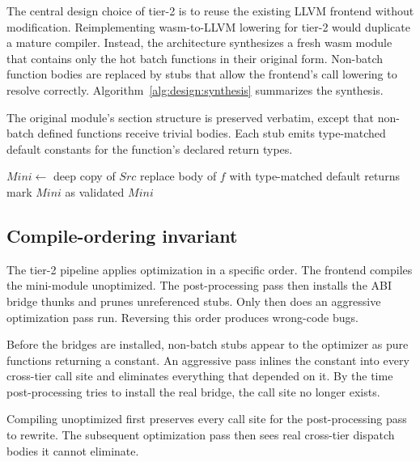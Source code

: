 The central design choice of tier-2 is to reuse the existing LLVM frontend without modification. Reimplementing wasm-to-LLVM lowering for tier-2 would duplicate a mature compiler. Instead, the architecture synthesizes a fresh wasm module that contains only the hot batch functions in their original form. Non-batch function bodies are replaced by stubs that allow the frontend's call lowering to resolve correctly. Algorithm~\ref{alg:design:synthesis} summarizes the synthesis.

The original module's section structure is preserved verbatim, except that non-batch defined functions receive trivial bodies. Each stub emits type-matched default constants for the function's declared return types.

\begin{algorithm}
\caption{Mini-module synthesis for a tier-2 batch.}
\label{alg:design:synthesis}
\begin{algorithmic}[1]
  \State $Mini \gets$ deep copy of $Src$
      \State replace body of $f$ with type-matched default returns
    \EndIf
  \EndFor
  \State mark $Mini$ as validated
  \State \Return $Mini$
\EndProcedure
\end{algorithmic}
\end{algorithm}

\subsection{Compile-ordering invariant}
\label{sec:design:tier2:ordering}

The tier-2 pipeline applies optimization in a specific order. The frontend compiles the mini-module unoptimized. The post-processing pass then installs the ABI bridge thunks and prunes unreferenced stubs. Only then does an aggressive optimization pass run. Reversing this order produces wrong-code bugs.

Before the bridges are installed, non-batch stubs appear to the optimizer as pure functions returning a constant. An aggressive pass inlines the constant into every cross-tier call site and eliminates everything that depended on it. By the time post-processing tries to install the real bridge, the call site no longer exists.

Compiling unoptimized first preserves every call site for the post-processing pass to rewrite. The subsequent optimization pass then sees real cross-tier dispatch bodies it cannot eliminate.

